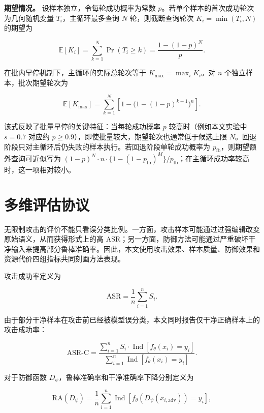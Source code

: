 \documentclass[type=bachelor,oneside]{fduthesis}
\newcommand{\indicator}[1]{\operatorname{Ind}\!\left[#1\right]}
\begin{document}
\textbf{期望情况。} 设样本独立，令每轮成功概率为常数 $p$。若单个样本的首次成功轮次为几何随机变量 $T_i$，主循环最多查询 $N$ 轮，则截断查询轮次 $K_i=\min(T_i,N)$ 的期望为

\begin{equation}
  \mathbb{E}[K_i] = \sum_{k=1}^{N}\Pr(T_i \ge k)
  = \frac{1-(1-p)^N}{p}.
  \label{eq:query_single_expected}
\end{equation}

在批内早停机制下，主循环的实际总轮次等于 $K_{\max}=\max_i K_i$。对 $n$ 个独立样本，批次期望轮次为

\begin{equation}
  \mathbb{E}[K_{\max}] = \sum_{k=1}^{N}\!\left[1 - \bigl(1-(1-p)^{k-1}\bigr)^n\right].
  \label{eq:query_expected}
\end{equation}

该式反映了批量早停的关键特征：当每轮成功概率 $p$ 较高时（例如本文实验中 $s=0.7$ 对应约 $p\geq 0.9$），即使批量较大，期望轮次也通常低于候选上限 $N$。回退阶段只对主循环后仍失败的样本执行。若回退阶段单轮成功概率为 $p_{\text{fb}}$，则期望额外查询可近似写为 $(1-p)^N \cdot n \cdot \{1-(1-p_{\text{fb}})^M\}/p_{\text{fb}}$；在主循环成功率较高时，这一项相对较小。

\section{多维评估协议}

无限制攻击的评价不能只看误分类比例。一方面，攻击样本可能通过过强编辑改变原始语义，从而获得形式上的高 ASR；另一方面，防御方法可能通过严重破坏干净输入来提高部分鲁棒准确率。因此，本文使用攻击效果、样本质量、防御效果和资源代价四组指标共同刻画方法表现。

攻击成功率定义为

\begin{equation}
  \text{ASR} = \frac{1}{n}\sum_{i=1}^{n} S_i.
  \label{eq:asr}
\end{equation}

由于部分干净样本在攻击前已经被模型误分类，本文同时报告仅干净正确样本上的攻击成功率：

\begin{equation}
  \text{ASR-C} =
  \frac{\sum_{i=1}^{n} S_i\cdot \indicator{f_\theta(x_i)=y_i}}
       {\sum_{i=1}^{n} \indicator{f_\theta(x_i)=y_i}}.
  \label{eq:asrc}
\end{equation}

对于防御函数 $D_\psi$，鲁棒准确率和干净准确率下降分别定义为

\begin{equation}
  \text{RA}(D_\psi) =
  \frac{1}{n}\sum_{i=1}^{n}
  \indicator{f_\theta(D_\psi(x_{i,\text{adv}}))=y_i},
  \label{eq:ra}
\end{equation}
\end{document}
